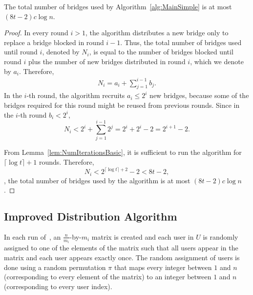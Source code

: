 \begin{lemma} \label{lem:NumBridgesBasic}
	The total number of bridges used by Algorithm~\ref{alg:MainSimple} is at most ${(8t - 2)c\log{n}}$.
\end{lemma}
\begin{proof}
	In every round ${i > 1}$, the algorithm distributes a new bridge only to replace a bridge blocked in round ${i-1}$. Thus, the total number of bridges used until round $i$, denoted by $N_i$, is equal to the number of bridges blocked until round $i$ plus the number of new bridges distributed in round $i$, which we denote by $a_i$. Therefore,
	\begin{align}
		N_i = a_i + \sum_{j=1}^{i-1} b_j. \label{eq:NumBridges}
	\end{align}
	In the $i$-th round, the algorithm recruits ${a_i \leq 2^i}$ new bridges, because some of the bridges required for this round might be reused from previous rounds. Since in the $i$-th round ${b_i < 2^i}$,
	\[N_i < 2^i + \sum_{j=1}^{i-1} 2^j = 2^i + 2^{i} - 2 = 2^{i+1} - 2.\]
	
	From Lemma~\ref{lem:NumIterationsBasic}, it is sufficient to run the algorithm for ${\lceil \log{t} \rceil + 1}$ rounds. Therefore,
	\[N_i < 2^{\lceil \log{t} \rceil + 2} - 2 < 8t - 2,\]
	\ie, the total number of bridges used by the algorithm is at most ${(8t - 2)c\log{n}}$.
\end{proof}

\subsection{Improved Distribution Algorithm}

In each run of~, an $\frac{n}{m_i}$-by-$m_i$ matrix is created and each user in $U$ is randomly assigned to one of the elements of the matrix such that all users appear in the matrix and each user appears exactly once. The random assignment of users is done using a random permutation $\pi$ that maps every integer between $1$ and $n$ (corresponding to every element of the matrix) to an integer between $1$ and $n$ (corresponding to every user index).

